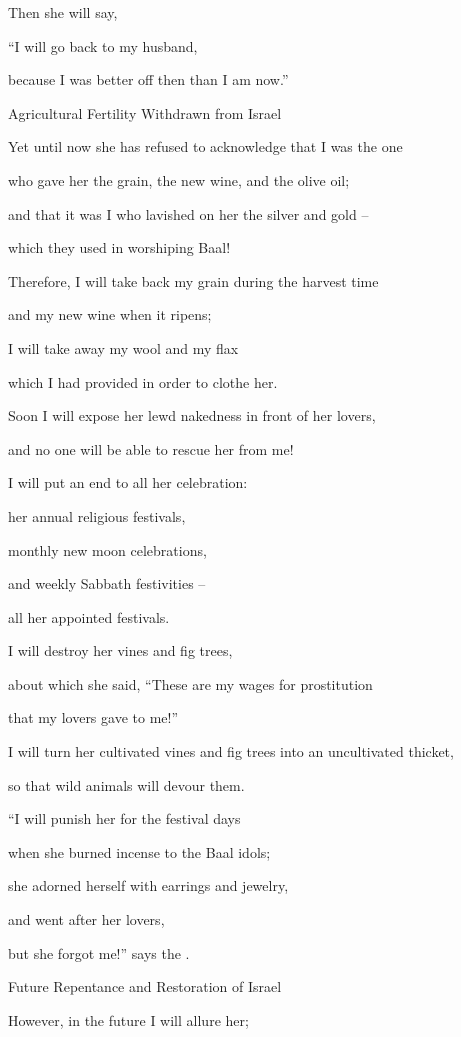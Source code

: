 {\par }{\Q Then she will say,
\par }{\Q “I will go
back
to
my husband,
\par }{\Q because
I was better
off then
than I am now.”
\par }{\SH Agricultural Fertility Withdrawn from Israel
\par }{\Q {}Yet until now she has refused
to acknowledge
that
I
was the one
\par }{\Q who gave
her the grain,
the new wine,
and the olive oil;
\par }{\Q and that it was I who lavished
on her the silver
and gold
–
\par }{\Q which they used
in worshiping Baal!
\par }{\Q {}Therefore,
I will take
back
my grain
during the harvest time
\par }{\Q and my new wine
when it ripens;
\par }{\Q I will take away
my wool
and my flax
\par }{\Q which I had provided in order to clothe
her.
\par }{\Q {}Soon
I will expose
her lewd
nakedness in front
of her lovers,
\par }{\Q and no
one will be able to rescue her from me!
\par }{\Q {}I will put an end
to all
her celebration:
\par }{\Q her annual
religious festivals,
\par }{\Q monthly new moon
celebrations,
\par }{\Q and weekly
Sabbath festivities –
\par }{\Q all her appointed festivals.
\par }{\Q {}I will destroy
her vines
and fig trees,
\par }{\Q about which
she said,
“These are my wages
for prostitution

\par }{\Q that
my lovers
gave
to me!”
\par }{\Q I will turn
her cultivated vines and fig trees into an uncultivated thicket,
\par }{\Q so that wild
animals
will devour them.
\par }{\Q {}“I will punish
her for the festival days
\par }{\Q when she burned incense
to the Baal
idols;

\par }{\Q she adorned
herself with
earrings
and jewelry,
\par }{\Q and went
after
her lovers,
\par }{\Q but she forgot
me!” says
the {}.
\par }{\SH Future Repentance and Restoration of Israel
\par }{\Q {}However, in the future I
will allure
her;

}
